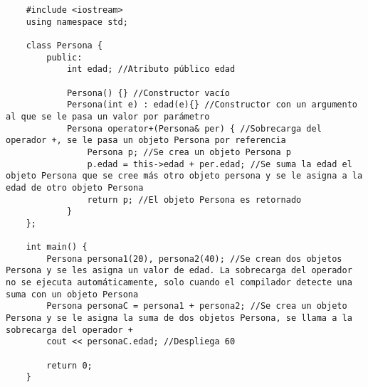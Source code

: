 \begin{lstlisting}
    #include <iostream>
    using namespace std;
    
    class Persona {
        public:
            int edad; //Atributo público edad

            Persona() {} //Constructor vacío
            Persona(int e) : edad(e){} //Constructor con un argumento al que se le pasa un valor por parámetro
            Persona operator+(Persona& per) { //Sobrecarga del operador +, se le pasa un objeto Persona por referencia
                Persona p; //Se crea un objeto Persona p
                p.edad = this->edad + per.edad; //Se suma la edad el objeto Persona que se cree más otro objeto persona y se le asigna a la edad de otro objeto Persona
                return p; //El objeto Persona es retornado
            }
    };

    int main() {
        Persona persona1(20), persona2(40); //Se crean dos objetos Persona y se les asigna un valor de edad. La sobrecarga del operador no se ejecuta automáticamente, solo cuando el compilador detecte una suma con un objeto Persona
        Persona personaC = persona1 + persona2; //Se crea un objeto Persona y se le asigna la suma de dos objetos Persona, se llama a la sobrecarga del operador +
        cout << personaC.edad; //Despliega 60
        
        return 0;
    }
\end{lstlisting}

